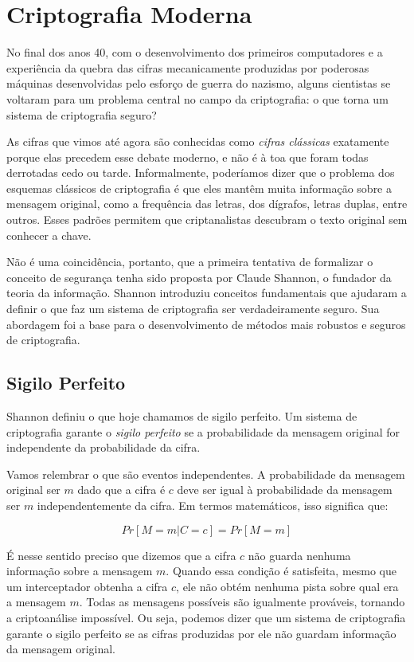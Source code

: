 \chapter{Criptografia Moderna}
\label{cha:criptografia-moderna}

No final dos anos 40, com o desenvolvimento dos primeiros computadores e a experiência da quebra das cifras mecanicamente produzidas por poderosas máquinas desenvolvidas pelo esforço de guerra do nazismo, alguns cientistas se voltaram para um problema central no campo da criptografia: o que torna um sistema de criptografia seguro?

As cifras que vimos até agora são conhecidas como {\em cifras clássicas} exatamente porque elas precedem esse debate moderno, e não é à toa que foram todas derrotadas cedo ou tarde.
Informalmente, poderíamos dizer que o problema dos esquemas clássicos de criptografia é que eles mantêm muita informação sobre a mensagem original, como a frequência das letras, dos dígrafos, letras duplas, entre outros.
Esses padrões permitem que criptanalistas descubram o texto original sem conhecer a chave.

Não é uma coincidência, portanto, que a primeira tentativa de formalizar o conceito de segurança tenha sido proposta por Claude Shannon, o fundador da teoria da informação.
Shannon introduziu conceitos fundamentais que ajudaram a definir o que faz um sistema de criptografia ser verdadeiramente seguro.
Sua abordagem foi a base para o desenvolvimento de métodos mais robustos e seguros de criptografia.

\section{Sigilo Perfeito}
\label{sec:sigilo-perfeito}

Shannon definiu o que hoje chamamos de sigilo perfeito.
Um sistema de criptografia garante o {\em sigilo perfeito} se a probabilidade da mensagem original for independente da probabilidade da cifra.

Vamos relembrar o que são eventos independentes.
A probabilidade da mensagem original ser $m$ dado que a cifra é $c$ deve ser igual à probabilidade da mensagem ser $m$ independentemente da cifra.
Em termos matemáticos, isso significa que:

\begin{displaymath}
  Pr[M = m | C = c] = Pr[M = m]
\end{displaymath}

É nesse sentido preciso que dizemos que a cifra $c$ não guarda nenhuma informação sobre a mensagem $m$.
Quando essa condição é satisfeita, mesmo que um interceptador obtenha a cifra $c$, ele não obtém nenhuma pista sobre qual era a mensagem $m$.
Todas as mensagens possíveis são igualmente prováveis, tornando a criptoanálise impossível.
Ou seja, podemos dizer que um sistema de criptografia garante o sigilo perfeito se as cifras produzidas por ele não guardam informação da mensagem original.

